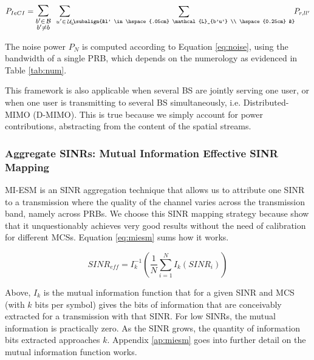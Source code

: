 \begin{equation} \label{eq:ieci}
    P_{IeCI} = \mathlarger{\mathlarger{\sum}}_{\substack{b' \in \hspace{.05cm} \mathcal{B} \\ b' \neq b}} \ \mathlarger{\sum}_{\ u' \in \hspace{.05cm} \mathcal{U}_{b'}} \hspace{-0.2cm} \sum_{\subalign{&l' \in \hspace{.05cm} \mathcal{L}_{b'u'} \\ \hspace{0.25cm} &}} \hspace{-0.1cm} P_{r, ll'} 
\end{equation}

The noise power $P_N$ is computed according to Equation \ref{eq:noise}, using the bandwidth of a single PRB, which depends on the numerology as evidenced in Table \ref{tab:num}.

This framework is also applicable when several BS are jointly serving one user, or when one user is transmitting to several BS simultaneously, i.e. Distributed-MIMO (D-MIMO). This is true because we simply account for power contributions, abstracting from the content of the spatial streams.



\subsubsection*{Aggregate SINRs: Mutual Information Effective SINR Mapping}
\label{sec:miesm}

\acs{MI-ESM} is an SINR aggregation technique that allows us to attribute one SINR to a transmission where the quality of the channel varies across the transmission band, namely across PRBs. We choose this SINR mapping strategy because \cite{1656798, 4657235, 5982870, 6008103, miesm1} show that it unquestionably achieves very good results without the need of calibration for different MCSs. Equation \eqref{eq:miesm} sums how it works.

\begin{equation} \label{eq:miesm}
    SINR_{eff} = I_k^{-1} \left( \frac{1}{N} \sum_{i=1}^N I_k\left(SINR_i\right)\right)
\end{equation}

Above, $I_k$ is the mutual information function that for a given SINR and MCS (with $k$ bits per symbol) gives the bits of information that are conceivably extracted for a transmission with that SINR. For low SINRs, the mutual information is practically zero. As the SINR grows, the quantity of information bits extracted approaches $k$. Appendix \ref{ap:miesm} goes into further detail on the mutual information function works.  

